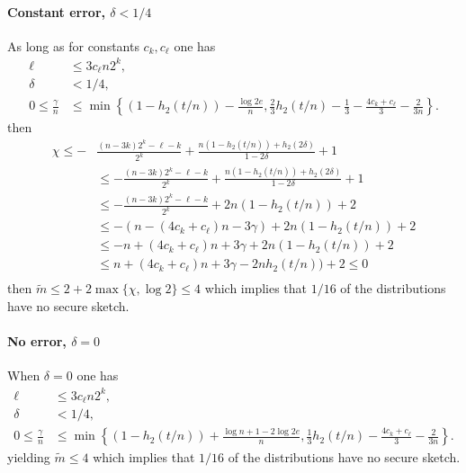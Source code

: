 \paragraph{Constant error, $\delta<1/4$} 
As long as for constants $c_k, c_\ell$ one has
\begin{align*}
\ell&\le 3c_\ell n2^k,\\
\delta &< 1/4,\\
0\le\frac{\gamma}{n} &\le \min\left\{(1-h_2(t/n)) - \frac{\log{2e}}{n}, \frac{2}{3}h_2(t/n)-\frac{1}{3}-\frac{4c_k+c_\ell}{3}-\frac{2}{3n}\right\}.
\end{align*} then 
\begin{align*}
\chi\le-&\frac{(n-3k)2^k-\ell-k}{2^k} + \frac{n(1-h_2(t/n)) +h_2(2\delta)}{1-2\delta}+1\\
&\le -\frac{(n-3k)2^k-\ell-k}{2^k} + \frac{n(1-h_2(t/n)) +h_2(2\delta)}{1-2\delta}+1 \\
&\le -\frac{(n-3k)2^k-\ell-k}{2^k} + 2n(1-h_2(t/n)) +2\\
 &\le -(n-(4c_k+c_\ell)n - 3\gamma) + 2n(1-h_2(t/n)) +2\\
&\le -n+(4c_k+c_\ell)n+3\gamma + 2n(1-h_2(t/n))+2 \\\
&\le n+(4c_k+c_\ell)n+3\gamma -2nh_2(t/n))+2 \le 0\\
\end{align*}
then $\tilde{m} \le 2+2\max\{\chi, \log{2}\} \le 4$ which implies that $1/16$ of the distributions have no secure sketch.

\paragraph{No error, $\delta=0$}
When $\delta = 0$ one has
\begin{align*}
\ell&\le 3c_\ell n2^k,\\
\delta &< 1/4,\\
0\le\frac{\gamma}{n} &\le \min\left\{(1-h_2(t/n)) +\frac{\log{n}+1-2\log{2e}}{n}, \frac{1}{3}h_2(t/n)-\frac{4c_k+c_\ell}{3}-\frac{2}{3n}\right\}.
\end{align*} 
yielding $\tilde{m}\le 4$ which implies that $1/16$ of the distributions have no secure sketch.




